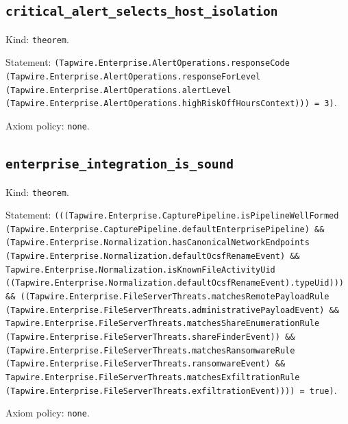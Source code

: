 \documentclass[11pt]{article}
\begin{document}
\subsection*{\texttt{critical\_alert\_selects\_host\_isolation}}
\noindent Kind: \texttt{theorem}.\par
\noindent Statement: \texttt{(Tapwire.Enterprise.AlertOperations.responseCode (Tapwire.Enterprise.AlertOperations.responseForLevel (Tapwire.Enterprise.AlertOperations.alertLevel (Tapwire.Enterprise.AlertOperations.highRiskOffHoursContext))) = 3)}.\par
\noindent Axiom policy: \texttt{none}.\par
\subsection*{\texttt{enterprise\_integration\_is\_sound}}
\noindent Kind: \texttt{theorem}.\par
\noindent Statement: \texttt{(((Tapwire.Enterprise.CapturePipeline.isPipelineWellFormed (Tapwire.Enterprise.CapturePipeline.defaultEnterprisePipeline) \&\& (Tapwire.Enterprise.Normalization.hasCanonicalNetworkEndpoints (Tapwire.Enterprise.Normalization.defaultOcsfRenameEvent) \&\& Tapwire.Enterprise.Normalization.isKnownFileActivityUid ((Tapwire.Enterprise.Normalization.defaultOcsfRenameEvent).typeUid))) \&\& ((Tapwire.Enterprise.FileServerThreats.matchesRemotePayloadRule (Tapwire.Enterprise.FileServerThreats.administrativePayloadEvent) \&\& Tapwire.Enterprise.FileServerThreats.matchesShareEnumerationRule (Tapwire.Enterprise.FileServerThreats.shareFinderEvent)) \&\& (Tapwire.Enterprise.FileServerThreats.matchesRansomwareRule (Tapwire.Enterprise.FileServerThreats.ransomwareEvent) \&\& Tapwire.Enterprise.FileServerThreats.matchesExfiltrationRule (Tapwire.Enterprise.FileServerThreats.exfiltrationEvent)))) = true)}.\par
\noindent Axiom policy: \texttt{none}.\par
\end{document}
